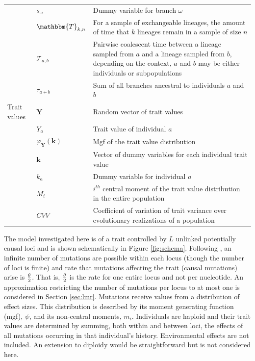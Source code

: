 \begin{table}
\begin{tabular}{l l l}
                                         & $s_\omega$ & Dummy variable for branch $\omega$ \\
                                         & $\mathbbm{T}_{k,n}$ & \multicolumn{1}{p{10cm}}{For a sample of exchangeable lineages, the amount of time that $k$ lineages remain in a sample of size $n$}\\
                                         & $\mathcal{T}_{a,b}$ & \multicolumn{1}{p{10cm}}{Pairwise coalescent time between a lineage sampled from $a$ and a lineage sampled from $b$, depending on the context, $a$ and $b$ may be either individuals or subpopulations}\\
                                         & $\tau_{a+b}$ & Sum of all branches ancestral to individuals $a$ and $b$\\
    Trait values & $\mathbf{Y}$ & Random vector of trait values \\
                                         & $Y_a$ & Trait value of individual $a$\\
                                         & $\varphi_{\mathbf{Y}}(\mathbf{k})$ & Mgf of the trait value distribution \\
                                         & $\mathbf{k}$ & \multicolumn{1}{p{10cm}}{Vector of dummy variables for each individual trait value}\\
                                         & $k_a$ & Dummy variable for individual $a$\\
                                         & $M_i$ & \multicolumn{1}{p{10cm}}{$i^{th}$ central moment of the trait value distribution in the entire population}\\
                                         & $CVV$ & \multicolumn{1}{p{10cm}}{Coefficient of variation of trait variance over evolutionary realizations of a population}\\
    \hline
  \end{tabular}
  \label{notation}
\end{table}

The model investigated here is of a trait controlled by $L$ unlinked potentially
causal loci and is shown schematically in Figure \ref{fig:schema}. Following
\citet{Kimura1969}, an infinite number of mutations are possible within each
locus (though the number of loci is finite) and rate that mutations affecting
the trait (causal mutations) arise is $\frac{\theta}{2}$. That is, $\frac{\theta}{2}$ is the rate for one
entire locus and not per nucleotide. An approximation restricting the number of
mutations per locus to at most one is considered in Section \ref{sec:lmr}.
Mutations receive values from a distribution of effect sizes. This distribution
is described by its moment generating function (mgf), $\psi$, and its
non-central moments, $m_i$. Individuals are haploid and their trait values are
determined by summing, both within and between loci, the effects of all
mutations occurring in that individual's history. Environmental effects are not
included. An extension to diploidy would be straightforward but is not
considered here.

